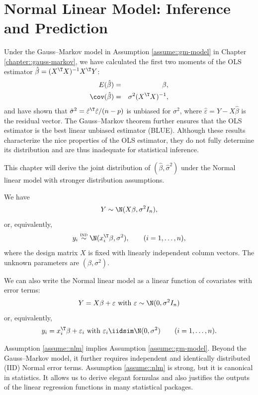  
\chapter{Normal Linear Model: Inference and Prediction}
 \label{chapter::normal-linear-model}





Under the Gauss--Markov model in Assumption \ref{assume::gm-model} in Chapter \ref{chapter::gauss-markov}, we have calculated the first two moments of the OLS estimator $\hat{\beta} = (X^{\T} X)^{-1} X^{\T} Y$:
\begin{eqnarray*}
E(\hat{\beta}) &=& \beta,\\
\cov(\hat{\beta}) &=& \sigma^{2}(X^{\T}X)^{-1},
\end{eqnarray*}
and have shown that $\hat{\sigma}^{2} =   \hat{\varepsilon}^{\T}  \hat{\varepsilon} / (n-p)$ is unbiased for $\sigma^{2}$, where $\hat{\varepsilon} = Y - X \hat{\beta}$ is the residual vector. The Gauss--Markov theorem further ensures that the OLS estimator is the best linear unbiased estimator (BLUE). 
Although these results characterize the nice properties of the OLS estimator,
they do not fully determine its distribution and are thus inadequate
for statistical inference.

 This chapter will derive the joint distribution
of $(\hat{\beta},\hat{\sigma}^{2})$ under the Normal linear model with stronger distribution assumptions. 

 

\begin{assumption}
\label{assume::nlm}
We have
$$
Y\sim\N(X\beta,\sigma^{2}I_{n}) , 
$$
or, equivalently,
$$
y_{i} \stackrel{ \textsc{ind} }{ \sim}\N(x_{i}^{\T}\beta,\sigma^{2}),\qquad(i=1,\ldots,n),
$$ 
where the design matrix $X$ is fixed with linearly independent column vectors. The unknown parameters are $(\beta,\sigma^{2})$. 
\end{assumption}

We can also write the Normal linear model as a linear function of covariates with error terms:
$$
Y = X\beta +\varepsilon \text{ with } \varepsilon \sim \N(0,\sigma^2 I_n) 
$$
or, equivalently, 
$$
y_i = x_{i}^{\T}\beta  +\varepsilon_i \text{ with } \varepsilon_i \iidsim \N(0,\sigma^2) \qquad(i=1,\ldots,n).
$$
 


Assumption \ref{assume::nlm} implies Assumption \ref{assume::gm-model}. Beyond the Gauss--Markov model, it further requires independent and identically distributed (IID) Normal error terms. 
Assumption \ref{assume::nlm} is strong, but it is canonical in statistics. It allows us to derive elegant formulas and also justifies the outputs of the linear regression functions in many statistical packages. 


